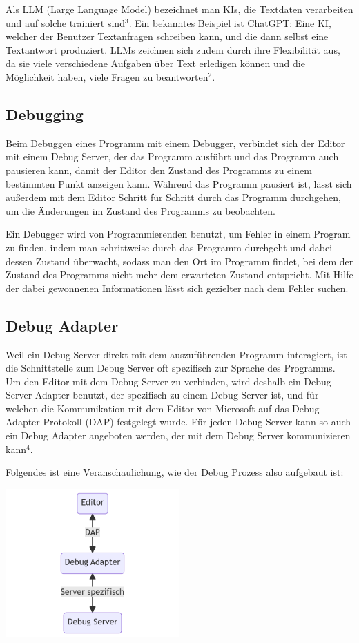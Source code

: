 \documentclass[a4paper,12pt,ngerman]{scrartcl}
\begin{document}
Als LLM (Large Language Model) bezeichnet man KIs, die Textdaten verarbeiten und auf solche trainiert sind$^3$. Ein bekanntes Beispiel ist ChatGPT: Eine KI, welcher der Benutzer Textanfragen schreiben kann, und die dann selbst eine Textantwort produziert. LLMs zeichnen sich zudem durch ihre Flexibilität aus, da sie viele verschiedene Aufgaben über Text erledigen können und die Möglichkeit haben, viele Fragen zu beantworten$^2$.

\subsection{Debugging}

Beim Debuggen eines Programm mit einem Debugger, verbindet sich der Editor mit einem Debug Server, der das Programm ausführt und das Programm auch pausieren kann, damit der Editor den Zustand des Programms zu einem bestimmten Punkt anzeigen kann. Während das Programm pausiert ist, lässt sich außerdem mit dem Editor Schritt für Schritt durch das Programm durchgehen, um die Änderungen im Zustand des Programms zu beobachten.

Ein Debugger wird von Programmierenden benutzt, um Fehler in einem Program zu finden, indem man schrittweise durch das Programm durchgeht und dabei dessen Zustand überwacht, sodass man den Ort im Programm findet, bei dem der Zustand des Programms nicht mehr dem erwarteten Zustand entspricht. Mit Hilfe der dabei gewonnenen Informationen lässt sich gezielter nach dem Fehler suchen. 

\subsection{Debug Adapter}

Weil ein Debug Server direkt mit dem auszuführenden Programm interagiert, ist die Schnittstelle zum Debug Server oft spezifisch zur Sprache des Programms. Um den Editor mit dem Debug Server zu verbinden, wird deshalb ein Debug Server Adapter benutzt, der spezifisch zu einem Debug Server ist, und für welchen die Kommunikation mit dem Editor von Microsoft auf das Debug Adapter Protokoll (DAP) festgelegt wurde. Für jeden Debug Server kann so auch ein Debug Adapter angeboten werden, der mit dem Debug Server kommunizieren kann$^4$.

Folgendes ist eine Veranschaulichung, wie der Debug Prozess also aufgebaut ist:

\begin{center}
	\includegraphics[width=0.5\textwidth]{debugger}
\end{center}
\end{document}
